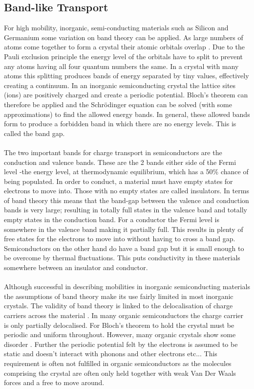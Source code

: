 \subsection{Band-like Transport}
For high mobility, inorganic, semi-conducting materials such as Silicon and Germanium some variation on band theory can be applied. As large numbers of atoms come together to form a crystal their atomic orbitals overlap \cite{AshcroftNeilW1976Ssp}. Due to the Pauli exclusion principle the energy level of the orbitals have to split to prevent any atoms having all four quantum numbers the same. In a crystal with many atoms this splitting produces bands of energy separated by tiny values, effectively creating a continuum. In an inorganic semiconducting crystal the lattice sites (ions) are positively charged and create a periodic potential. Bloch's theorem can therefore be applied and the Schr\"odinger equation can be solved (with some approximations) to find the allowed energy bands. In general, these allowed bands form to produce a forbidden band in which there are no energy levels. This is called the band gap.
\\\\
The two important bands for charge transport in semiconductors are the conduction and valence bands. These are the 2 bands either side of the Fermi level -the energy level, at thermodynamic equilibrium, which has a 50\% chance of being populated. In order to conduct, a material must have empty states for electrons to move into. Those with no empty states are called insulators. In terms of band theory this means that the band-gap between the valence and conduction bands is very large; resulting in totally full states in the valence band and totally empty states in the conduction band\cite{KittelCharles1996Itss}. For a conductor the Fermi level is somewhere in the valence band making it partially full. This results in plenty of free states for the electrons to move into without having to cross a band gap. Semiconductors on the other hand do have a band gap but it is small enough to be overcome by thermal fluctuations. This puts conductivity in these materials somewhere between an insulator and conductor.
\\\\
Although successful in describing mobilities in inorganic semiconducting materials the assumptions of band theory make its use fairly limited in most inorganic crystals. The validity of band theory is linked to the delocalisation of charge carriers across the material \cite{oberhofer_charge_2017}. In many organic semiconductors the charge carrier is only partially delocalised. For Bloch's theorem to hold the crystal must be periodic and uniform throughout. However, many organic crystals show some disorder \cite{Habgood2011May, Vehoff2010Aug}. Further the periodic potential felt by the electrons is assumed to be static and doesn't interact with phonons and other electrons etc... This requirement is often not fulfilled in organic semiconductors as the molecules comprising the crystal are often only held together with weak Van Der Waals forces and a free to move around.
